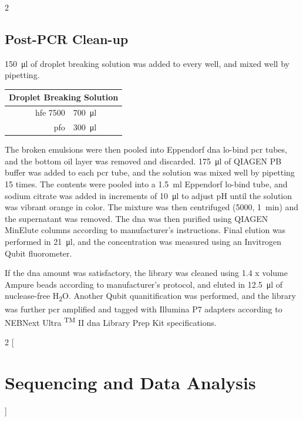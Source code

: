 \begin{appendix}
\begin{multicols}{2}
\subsection{Post-PCR Clean-up}
\SI{150}{\ul} of droplet breaking solution was added to every well, and mixed well by pipetting.\pms

\begin{center}
\begin{tabular}{r|l}
	\multicolumn{2}{c}{Droplet Breaking Solution} \\
	\hline
	\acrshort{hfe} 7500 & \SI{700}{\ul} \\
	\acrshort{pfo} & \SI{300}{\ul} \\
\end{tabular}
\end{center}
\medskip


The broken emulsions were then pooled into Eppendorf \acrshort{dna} lo-bind \acrshort{pcr} tubes, and the bottom oil layer was removed and discarded. \SI{175}{\ul} of QIAGEN PB buffer was added to each \acrshort{pcr} tube, and the solution was mixed well by pipetting 15 times. The contents were pooled into a \SI{1.5}{\ml} Eppendorf lo-bind tube, and sodium citrate was added in increments of \SI{10}{\ul} to adjust pH until the solution was vibrant orange in color. The mixture was then centrifuged (\SI{5000}{\rcf}, \SI{1}{\minute}) and the supernatant was removed. The \acrshort{dna} was then purified using QIAGEN MinElute columns according to manufacturer's instructions. Final elution was performed in \SI{21}{\ul}, and the concentration was measured using an Invitrogen Qubit fluorometer.\pms

If the \acrshort{dna} amount was satisfactory, the library was cleaned using 1.4 x volume Ampure beads according to manufacturer's protocol, and eluted in \SI{12.5}{\ul} of nuclease-free H\textsubscript{2}O. Another Qubit quanitification was performed, and the library was further \acrshort{pcr} amplified and tagged with Illumina P7 adapters according to  NEBNext Ultra \textsuperscript{TM} II \acrshort{dna} Library Prep Kit specifications.\pms
\end{multicols}

\newpage
\begin{multicols}{2}
[\section{Sequencing and Data Analysis}\label{app:seq}]


\end{multicols}
\end{appendix}
